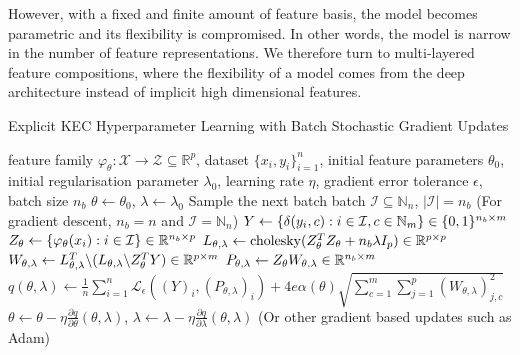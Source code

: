 \documentclass{article}
\begin{document}
		However, with a fixed and finite amount of feature basis, the model becomes parametric and its flexibility is compromised. In other words, the model is narrow in the number of feature representations. We therefore turn to multi-layered feature compositions, where the flexibility of a model comes from the deep architecture instead of implicit high dimensional features.

		\begin{algorithm}[tb]
			\caption{Explicit KEC Hyperparameter Learning with Batch Stochastic Gradient Updates}
			\label{alg:explicit_kernel_embedding_classifier_training}
			\begin{algorithmic}[1]
				 feature family $\varphi_{\theta} : \mathcal{X} \to \mathcal{Z} \subseteq \mathbb{R}^{p}$, dataset $\{x_{i}, y_{i}\}_{i = 1}^{n}$, initial feature parameters $\theta_{0}$, initial regularisation parameter $\lambda_{0}$, learning rate $\eta$, gradient error tolerance $\epsilon$, batch size $n_{b}$
				\STATE $\theta \leftarrow \theta_{0}$, $\lambda \leftarrow \lambda_{0}$
				\REPEAT
				\STATE Sample the next batch batch $\mathcal{I} \subseteq \mathbb{N}_{n}$, $| \mathcal{I} | = n_{b}$ \hspace{\fill} (For gradient descent, $n_{b} = n$ and $\mathcal{I} = \mathbb{N}_{n}$)
				\STATE $Y \leftarrow \{\delta(y_{i}, c) : i \in \mathcal{I}, c \in \mathbb{N}_{m}\} \hspace{\fill} \in \{0, 1\}^{n_{b} \times m}$
				\STATE $Z_{\theta} \leftarrow \{\varphi_{\theta}(x_{i}) : i \in \mathcal{I}\} \hspace{\fill} \in \mathbb{R}^{n_{b} \times p}$
				\STATE $L_{\theta, \lambda} \leftarrow \mathrm{cholesky}(Z_{\theta}^{T} Z_{\theta} + n_{b} \lambda I_{p}) \hspace{\fill} \in \mathbb{R}^{p \times p}$
				\STATE $W_{\theta, \lambda} \leftarrow L_{\theta, \lambda}^{T} \backslash (L_{\theta, \lambda} \backslash Z_{\theta}^{T} Y) \hspace{\fill} \in \mathbb{R}^{p \times m}$
				\STATE $P_{\theta, \lambda} \leftarrow Z_{\theta} W_{\theta, \lambda} \hspace{\fill} \in \mathbb{R}^{n_{b} \times m}$
				\STATE $q(\theta, \lambda) \leftarrow \frac{1}{n} \sum_{i = 1}^{n} \mathcal{L}_{\epsilon}((Y)_{i}, (P_{\theta, \lambda})_{i}) + 4 e \alpha(\theta) \sqrt{\sum_{c = 1}^{m} \sum_{j = 1}^{p} (W_{\theta, \lambda})_{j, c}^{2}}$
				\STATE $\theta \leftarrow \theta - \eta \frac{\partial q}{\partial \theta}(\theta, \lambda)$, $\lambda \leftarrow \lambda - \eta \frac{\partial q}{\partial \lambda}(\theta, \lambda)$ \hspace{\fill} (Or other gradient based updates such as Adam)

\end{algorithmic}
\end{algorithm}
\end{document}
